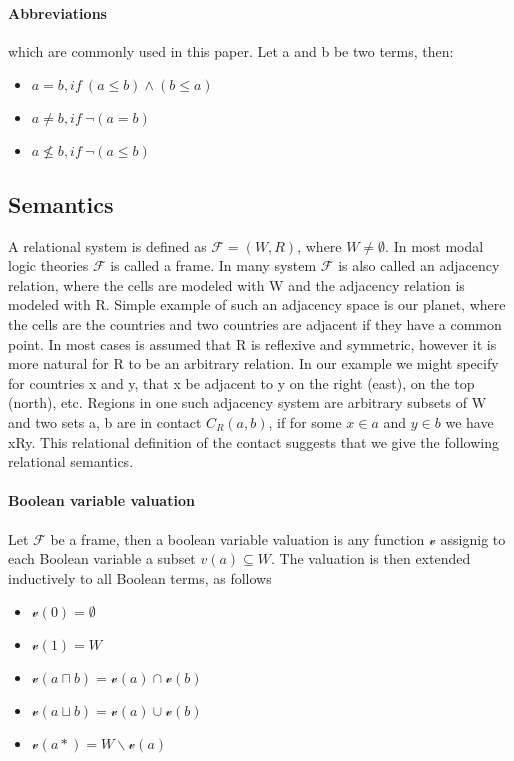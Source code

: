 \documentclass{article}
\begin{document}
	\paragraph{Abbreviations}
which are commonly used in this paper. Let a and b be two terms, then:
	\begin{itemize}
		\item $a = b,\textit{if}\: (a \le b) \land (b \le a)$
		\item $a \neq b,\textit{if}\: \neg (a = b) $
		\item $a \nleq b,\textit{if}\: \neg (a \le b)$
	\end{itemize}

	\subsection{Semantics}
		A relational system is defined as $\mathcal{F} = (W, R)$, where $W \neq \emptyset$. In most modal logic theories $\mathcal{F}$ is called a frame. In many system $\mathcal{F}$ is also called an adjacency relation, where the cells are modeled with W and the adjacency relation is modeled with R. Simple example of such an adjacency space is our planet, where the cells are the countries and two countries are adjacent if they have a common point. In most cases is assumed that R is reflexive and symmetric, however it is more natural for R to be an arbitrary relation. In our example we might specify for countries x and y, that x be adjacent to y on the right (east), on the top (north), etc. Regions in one such adjacency system are arbitrary subsets of W and two sets a, b are in contact $C_R(a, b)$, if for some $x \in a$ and $y \in b$ we have xRy. This relational definition of the contact suggests that we give the following relational semantics. 

	\paragraph{Boolean variable valuation}
Let $\mathcal{F}$  be a frame, then a boolean variable valuation is any function $\mathscr{v}$ assignig to each Boolean variable a subset $v(a) \subseteq W$. The valuation is then extended inductively to all Boolean terms, as follows
		\begin{itemize}
			\item $\mathscr{v}(0) = \emptyset$
			\item $\mathscr{v}(1) = W$
			\item $\mathscr{v}(a \sqcap b) = \mathscr{v}(a) \cap \mathscr{v}(b)$
			\item $\mathscr{v}(a \sqcup b) = \mathscr{v}(a) \cup \mathscr{v}(b)$
			\item $\mathscr{v}(a*) = W \backslash  \mathscr{v}(a)$
		\end{itemize}
\end{document}
